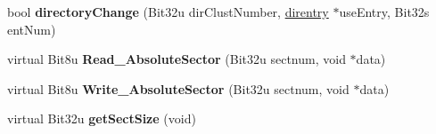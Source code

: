 \begin{DoxyCompactItemize}
\item 
\hypertarget{classfatDrive_a33bfa188995f1f5bf813af5a5b8e24ba}{bool {\bfseries directory\-Change} (Bit32u dir\-Clust\-Number, \hyperlink{structdirentry}{direntry} $\ast$use\-Entry, Bit32s ent\-Num)}\label{classfatDrive_a33bfa188995f1f5bf813af5a5b8e24ba}

\item 
\hypertarget{classfatDrive_a0347726faa951ece86554389c1582365}{virtual Bit8u {\bfseries Read\-\_\-\-Absolute\-Sector} (Bit32u sectnum, void $\ast$data)}\label{classfatDrive_a0347726faa951ece86554389c1582365}

\item 
\hypertarget{classfatDrive_a0a2171e173e8718bc73b2a4ce7493aa6}{virtual Bit8u {\bfseries Write\-\_\-\-Absolute\-Sector} (Bit32u sectnum, void $\ast$data)}\label{classfatDrive_a0a2171e173e8718bc73b2a4ce7493aa6}

\item 
\hypertarget{classfatDrive_a8eec794d6977defe23a899c4ced8344d}{virtual Bit32u {\bfseries get\-Sect\-Size} (void)}\label{classfatDrive_a8eec794d6977defe23a899c4ced8344d}

\end{DoxyCompactItemize}
